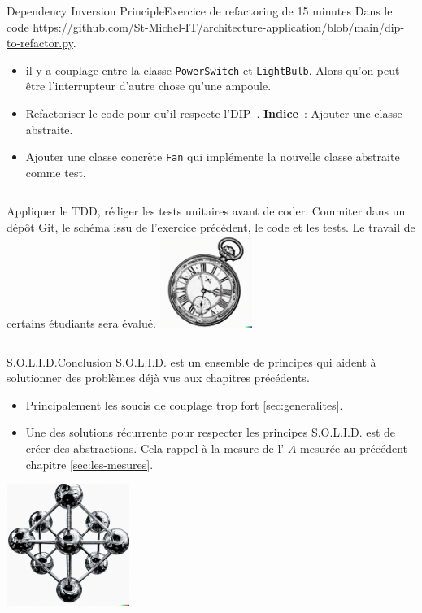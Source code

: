 \documentclass{beamer}
\begin{document}
    \begin{frame}{Dependency Inversion Principle}{Exercice \execcounterdispinc{} de refactoring de 15 minutes}
        Dans le code \url{https://github.com/St-Michel-IT/architecture-application/blob/main/dip-to-refactor.py}.
        \begin{itemize}
            \item il y a couplage entre la classe \lstinline{PowerSwitch} et \lstinline{LightBulb}.
            Alors qu'on peut être l'interrupteur d'autre chose qu'une ampoule.
            \item Refactoriser le code pour qu'il respecte l'DIP~. \textbf{Indice}~: Ajouter une classe abstraite.
            \item Ajouter une classe concrète \lstinline{Fan} qui implémente la nouvelle classe abstraite comme test.
        \end{itemize}
        \bigbreak
        \begin{columns}
            Appliquer le TDD, rédiger les tests unitaires avant de coder.
            \bigbreak
            Commiter dans un dépôt Git, le schéma issu de l'exercice précédent, le code et les tests.
            \bigbreak
            Le travail de certains étudiants sera évalué.
            \centering
            \includegraphics[width=3cm]{image/engraving-of-an-old-watch}
        \end{columns}
    \end{frame}

    \begin{frame}{S.O.L.I.D.}{Conclusion}
        S.O.L.I.D. est un ensemble de principes qui aident à solutionner des problèmes déjà vus aux chapitres précédents.
        \begin{itemize}
            \item Principalement les soucis de couplage trop fort \cref{sec:generalites}.
            \item Une des solutions récurrente pour respecter les principes S.O.L.I.D. est de créer des abstractions.
            Cela rappel à la mesure de l' $A$ mesurée au précédent chapitre \cref{sec:les-mesures}.
        \end{itemize}
        \bigbreak
        \centering
        \includegraphics[width=4cm]{image/carbon-atoms}
    \end{frame}
\end{document}

